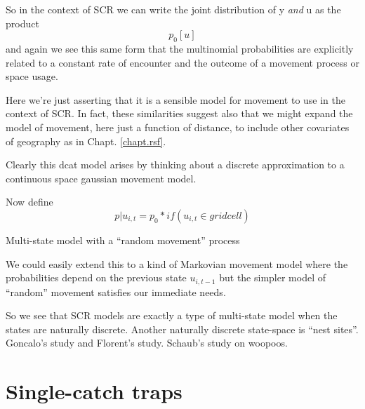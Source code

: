 So in the context of SCR we can write the joint distribution of y {\it
  and} u as the product
\[
p_{0} [u]
\]
and again we see this same form that the multinomial probabilities are
explicitly  related to a constant rate of encounter and the outcome of
a movement process or space usage.

Here we're just asserting that it is a sensible model for movement to use in
the context of SCR. In fact, these similarities suggest also that we might
expand the model of movement, here just a function of distance, to include
other covariates of geography as in Chapt. \ref{chapt.rsf}.

Clearly this dcat model arises by thinking about a discrete
approximation to a continuous space
gaussian movement model.

Now define
\[
 p|u_{i,t} = p_{0}*if(u_{i,t} \in grid cell)
\]

Multi-state model with a ``random movement'' process

We could easily extend this to a kind of Markovian movement model
where the probabilities depend on the previous state $u_{i,t-1}$ but
the simpler model of ``random'' movement satisfies our immediate needs.

So we see that SCR models are exactly a type of multi-state model when
the states are naturally discrete.  Another naturally discrete
state-space is ``nest sites''. Goncalo’s study and Florent’s
study. Schaub’s study on woopoos.

\section{Single-catch traps}
\label{poisson-mn.sec.singlecatch}

